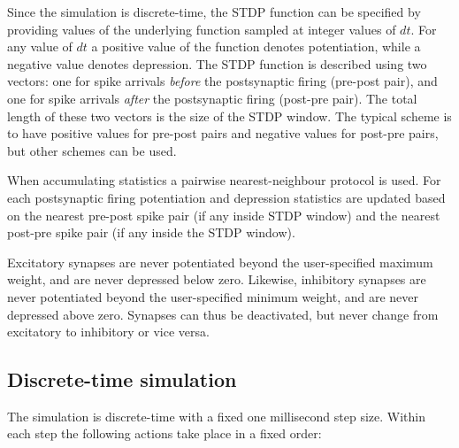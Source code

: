 \documentclass[a4paper]{article}
\begin{document}
Since the simulation is discrete-time, the STDP function can be specified by
providing values of the underlying function sampled at integer values of $dt$.
For any value of $dt$ a positive value of the function denotes potentiation,
while a negative value denotes depression. The STDP function is described using
two vectors: one for spike arrivals \emph{before} the postsynaptic firing
(pre-post pair), and one for spike arrivals \emph{after} the postsynaptic
firing (post-pre pair). The total length of these two vectors is the size of
the STDP window. The typical scheme is to have positive values for pre-post
pairs and negative values for post-pre pairs, but other schemes can be used.

When accumulating statistics a pairwise nearest-neighbour protocol is used.
For each postsynaptic firing potentiation and depression statistics are updated
based on the nearest pre-post spike pair (if any inside STDP window) and the
nearest post-pre spike pair (if any inside the STDP window).

Excitatory synapses are never potentiated beyond the user-specified maximum
weight, and are never depressed below zero. Likewise, inhibitory synapses are
never potentiated beyond the  user-specified minimum weight, and are never
depressed above zero. Synapses can thus be deactivated, but never change from
excitatory to inhibitory or vice versa.




\subsection{Discrete-time simulation}
\label{model:step}

The simulation is discrete-time with a fixed one millisecond step size. Within
each step the following actions take place in a fixed order:
\end{document}
